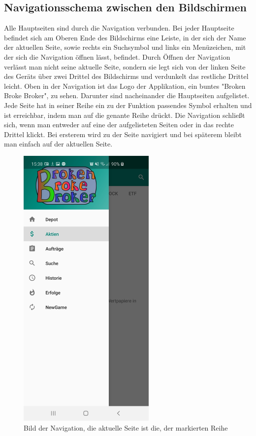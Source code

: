 \documentclass[10pt]{scrartcl}
\begin{document}
\subsection{Navigationsschema zwischen den Bildschirmen}

Alle Hauptseiten sind durch die Navigation verbunden. Bei jeder Hauptseite befindet sich am Oberen Ende des Bildschirms eine Leiste, in der sich der Name der aktuellen Seite, sowie rechts ein Suchsymbol und  links ein Menüzeichen, mit der sich die Navigation öffnen lässt, befindet. Durch Öffnen der Navigation verlässt man nicht seine aktuelle Seite, sondern sie legt sich von der linken Seite des Geräts über zwei Drittel des Bildschirms und verdunkelt das restliche Drittel leicht. 
Oben in der Navigation ist das Logo der Applikation, ein buntes "Broken Broke Broker", zu sehen. Darunter sind nacheinander die Hauptseiten aufgelistet. Jede Seite hat in seiner Reihe ein zu der Funktion passendes Symbol erhalten und ist erreichbar, indem man auf die genante Reihe drückt. Die Navigation schließt sich, wenn man entweder auf eine der aufgelisteten Seiten oder in das rechte Drittel klickt. Bei ersterem wird zu der Seite navigiert und bei späterem bleibt man einfach auf der aktuellen Seite.

\begin{figure}[H]
	\centering
	\includegraphics[width=0.6\textwidth]{Bilder/Applikation/Navigation.jpg}
	\caption{Bild der Navigation, die aktuelle Seite ist die, der markierten Reihe}
\end{figure}
\end{document}
